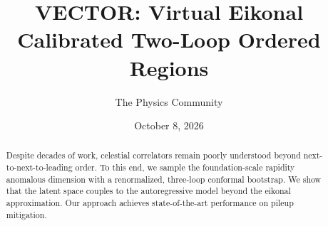 \documentclass[11pt]{article}
\title{VECTOR: Virtual Eikonal Calibrated Two-Loop Ordered Regions}
\author{The Physics Community}
\date{October 8, 2026}
\numberwithin{equation}{section}
\theoremstyle{definition}
\theoremstyle{remark}
\begin{document}
\maketitle
\begin{abstract}
Despite decades of work, celestial correlators remain poorly understood
beyond next-to-next-to-leading order. To this end, we sample the
foundation-scale rapidity anomalous dimension with a renormalized,
three-loop conformal bootstrap. We show that the latent space couples to
the autoregressive model beyond the eikonal approximation. Our approach
achieves state-of-the-art performance on pileup mitigation.
\end{abstract}
\tableofcontents





\nocite{*}


\end{document}
